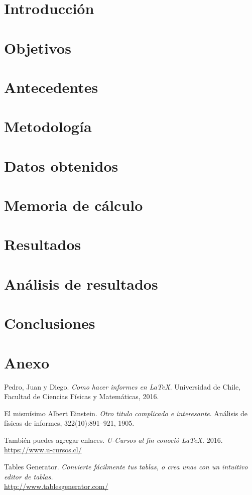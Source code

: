 \documentclass[11pt,letterpaper]{extarticle}        %
\numberwithin{equation}{section}                    %
\begin{document}
\newpage
\setcounter{page}{1}
\thispagestyle{NoPortada}

\section{Introducción}
\section{Objetivos}
\section{Antecedentes}
\section{Metodología}
\section{Datos obtenidos}
\section{Memoria de cálculo}
\section{Resultados}
\section{Análisis de resultados}
\section{Conclusiones}








\newpage
\section{Anexo}
\setcounter{section}{1}
\renewcommand*\thesection{\Alph{section}}

\newpage
\begin{thebibliography}{99}
	
		Pedro, Juan y Diego. 
		\textit{Como hacer informes en \LaTeX\.}. 
		Universidad de Chile, Facultad de Ciencias Físicas y Matemáticas, 2016.
	
		 El mismísimo Albert Einstein. 
		\textit{Otro titulo complicado e interesante}. 
		Análisis de físicas de informes, 322(10):891–921, 1905.
	
		También puedes agregar enlaces.
		\textit{U-Cursos al fin conoció \LaTeX.}
		2016.
		\\\url{https://www.u-cursos.cl/}
	
		Tables Generator.
		\textit{Convierte fácilmente tus tablas, o crea unas con un intuitivo editor de tablas.}
		\\\url{http://www.tablesgenerator.com/}
	
\end{thebibliography}
\end{document}
